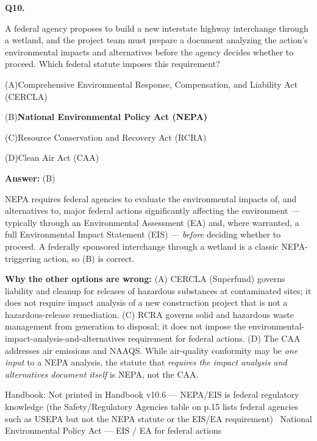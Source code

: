\documentclass[11pt]{article}
\newcommand{\correct}[1]{\textbf{#1}\;{\color{accent}$\checkmark$}}
\newcommand{\optline}[2]{\par\noindent\hspace{1.2em}(#1)\hspace{0.6em}#2}
\begin{document}
\vspace{9pt}
\filbreak
\textbf{\color{accent}Q10.}\par\vspace{2pt}
A federal agency proposes to build a new interstate highway interchange through a wetland, and the project team must prepare a document analyzing the action's environmental impacts and alternatives before the agency decides whether to proceed. Which federal statute imposes this requirement?\par\par\vspace{3pt}
\optline{A}{Comprehensive Environmental Response, Compensation, and Liability Act (CERCLA)}
\optline{B}{\correct{National Environmental Policy Act (NEPA)}}
\optline{C}{Resource Conservation and Recovery Act (RCRA)}
\optline{D}{Clean Air Act (CAA)}
\par\vspace{3pt}
\vspace{2pt}\par\noindent\colorbox{boxbg}{\parbox{\dimexpr\linewidth-2\fboxsep\relax}{%
\vspace{2pt}\textbf{Answer:} (B)\par\vspace{2pt}
{\small NEPA requires federal agencies to evaluate the environmental impacts of, and alternatives to, major federal actions significantly affecting the environment --- typically through an Environmental Assessment (EA) and, where warranted, a full Environmental Impact Statement (EIS) --- \emph{before} deciding whether to proceed. A federally sponsored interchange through a wetland is a classic NEPA-triggering action, so (B) is correct.\par
\textbf{Why the other options are wrong:} (A) CERCLA (Superfund) governs liability and cleanup for releases of hazardous substances at contaminated sites; it does not require impact analysis of a new construction project that is not a hazardous-release remediation. (C) RCRA governs solid and hazardous waste management from generation to disposal; it does not impose the environmental-impact-analysis-and-alternatives requirement for federal actions. (D) The CAA addresses air emissions and NAAQS. While air-quality conformity may be \emph{one input} to a NEPA analysis, the statute that \emph{requires the impact analysis and alternatives document itself} is NEPA, not the CAA.\par}\par\vspace{2pt}
{\footnotesize\color{soft}Handbook: Not printed in Handbook v10.6 --- NEPA/EIS is federal regulatory knowledge (the Safety/Regulatory Agencies table on p.15 lists federal agencies such as USEPA but not the NEPA statute or the EIS/EA requirement) \textbullet\ National Environmental Policy Act --- EIS / EA for federal actions}\vspace{2pt}
}}
\end{document}

